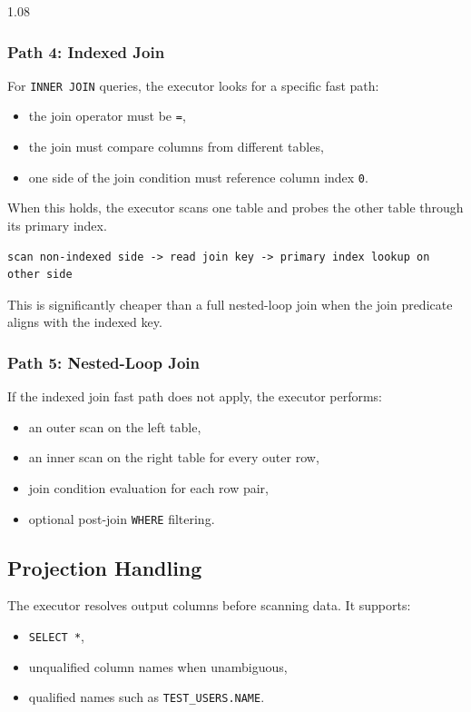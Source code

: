 \documentclass[11pt,a4paper]{article}
\begin{document}
\begin{spacing}{1.08}
\subsubsection{Path 4: Indexed Join}

For \texttt{INNER JOIN} queries, the executor looks for a specific fast path:

\begin{itemize}
    \item the join operator must be \texttt{=},
    \item the join must compare columns from different tables,
    \item one side of the join condition must reference column index \texttt{0}.
\end{itemize}

When this holds, the executor scans one table and probes the other table through its primary index.

\begin{lstlisting}
scan non-indexed side -> read join key -> primary index lookup on other side
\end{lstlisting}

This is significantly cheaper than a full nested-loop join when the join predicate aligns with the indexed key.

\subsubsection{Path 5: Nested-Loop Join}

If the indexed join fast path does not apply, the executor performs:

\begin{itemize}
    \item an outer scan on the left table,
    \item an inner scan on the right table for every outer row,
    \item join condition evaluation for each row pair,
    \item optional post-join \texttt{WHERE} filtering.
\end{itemize}

\subsection{Projection Handling}

The executor resolves output columns before scanning data. It supports:

\begin{itemize}
    \item \texttt{SELECT *},
    \item unqualified column names when unambiguous,
    \item qualified names such as \texttt{TEST\_USERS.NAME}.
\end{itemize}


\end{spacing}
\end{document}
